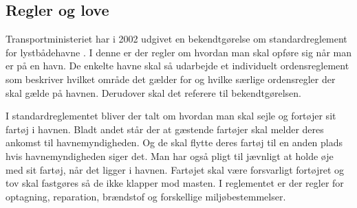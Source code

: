 \subsection{Regler og love}
Transportministeriet har i 2002 udgivet en bekendtgørelse om standardreglement for lystbådehavne \cite{standardreglement}. I denne er der regler om hvordan man skal opføre sig når man er på en havn. De enkelte havne skal så udarbejde et individuelt ordensreglement som beskriver hvilket område det gælder for og hvilke særlige ordensregler der skal gælde på havnen. Derudover skal det referere til bekendtgørelsen.

I standardreglementet bliver der talt om hvordan man skal sejle og fortøjer sit fartøj i havnen. Bladt andet står der at gæstende fartøjer skal melder deres ankomst til havnemyndigheden. Og de skal flytte deres fartøj til en anden plads hvis havnemyndigheden siger det. Man har også pligt til jævnligt at holde øje med sit fartøj, når det ligger i havnen. Fartøjet skal være forsvarligt fortøjret og tov skal fastgøres så de ikke klapper mod masten. I reglementet er der regler for optagning, reparation, brændstof og  forskellige miljøbestemmelser.